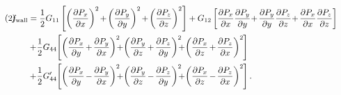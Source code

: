 \documentclass[paper=a4, fontsize=14pt]{scrartcl} %
\numberwithin{equation}{section} %
\numberwithin{figure}{section} %
\numberwithin{table}{section} %
\begin{document}
\begin{align}\tag{2}
\hspace{-5pt}f_\mathrm{wall} &= \frac{1}{2} G_{11} \left[\left(\frac{\partial P_x}{\partial x} \right)^2 \hspace{-1pt}+\hspace{-1pt} \left(\frac{\partial P_y}{\partial y}\right)^2 \hspace{-1pt}+\hspace{-1pt}\left( \frac{\partial P_z}{\partial z} \right)^2\right] + G_{12} \left[\frac{\partial P_x}{\partial x}\frac{\partial P_y}{\partial y}\hspace{-2pt} +\hspace{-1pt} \frac{\partial P_y}{\partial y} \frac{\partial P_z}{\partial z}\hspace{-2pt} +\hspace{-1pt} \frac{\partial P_x}{\partial x} \frac{\partial P_z}{\partial z} \right] \\ \nonumber
&+ \hspace{-2pt} \frac{1}{2} G_{44}  \hspace{-2pt}\left[\left(\frac{\partial P_x}{\partial y} \hspace{-1pt}+ \hspace{-1pt} \frac{\partial P_y}{\partial x} \right)^2 \hspace{-6pt}+\hspace{-2pt} \left(\frac{\partial P_y}{\partial z} \hspace{-1pt}+ \hspace{-1pt}\frac{\partial P_z}{\partial y} \right)^2 \hspace{-6pt}+\hspace{-2pt} \left(\frac{\partial P_x}{\partial z} \hspace{-1pt}+\hspace{-1pt} \frac{\partial P_z}{\partial x} \right)^2  \hspace{-0.5pt}\right] \\ \nonumber
&+ \hspace{-2pt}\frac{1}{2} G'_{44} \hspace{-2pt}\left[\left(\frac{\partial P_x}{\partial y} \hspace{-1pt}- \hspace{-1pt}\frac{\partial P_y}{\partial x} \right)^2 \hspace{-6pt} + \hspace{-2pt} \left(\frac{\partial P_y}{\partial z}\hspace{-1pt} - \hspace{-1pt}\frac{\partial P_z}{\partial y} \right)^2 \hspace{-6pt}+  \hspace{-2pt}\left(\frac{\partial P_x}{\partial z}\hspace{-1pt} - \hspace{-1pt}\frac{\partial P_z}{\partial x} \right)^2 \hspace{-0.5pt} \right]. \\ \nonumber
\end{align}
\end{document}
